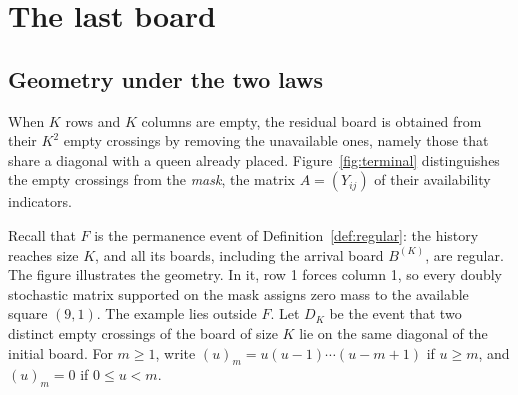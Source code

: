\section{The last board}\label{terminal}

\subsection{Geometry under the two laws}

When $K$ rows and $K$ columns are empty, the residual board is obtained from their $K^2$ empty
crossings by removing the unavailable ones, namely those that share a diagonal with a queen
already placed. Figure~\ref{fig:terminal} distinguishes the empty crossings from the \emph{mask},
the matrix $A=(Y_{ij})$ of their availability indicators.


Recall that $F$ is the permanence event of Definition~\ref{def:regular}: the history reaches size
$K$, and all its boards, including the arrival board $B^{(K)}$, are regular. The figure illustrates the
geometry. In it, row 1 forces column 1, so every doubly stochastic matrix supported on the mask
assigns
zero mass to the available square $(9,1)$. The example lies outside $F$. Let $D_K$ be the event
that two distinct empty crossings of the board of size $K$ lie on the same diagonal of the initial
board. For $m\ge 1$, write $(u)_m=u(u-1)\cdots(u-m+1)$ if $u\ge m$, and $(u)_m=0$ if $0\le u<m$.

